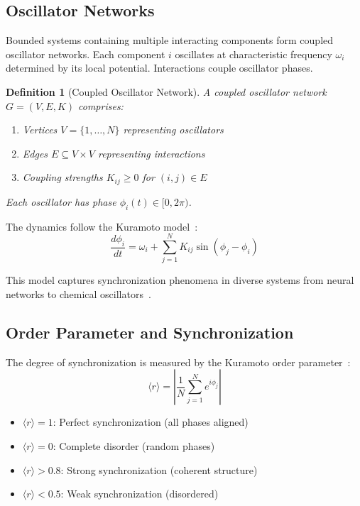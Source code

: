 \documentclass[twocolumn,aps,prb,superscriptaddress,longbibliography,floatfix]{revtex4-2}
\newtheorem{definition}[theorem]{Definition}
\theoremstyle{remark}
\newcommand{\orderpar}{\langle r \rangle}
\begin{document}
\subsection{Oscillator Networks}

Bounded systems containing multiple interacting components form coupled
oscillator networks. Each component $i$ oscillates at characteristic
frequency $\omega_i$ determined by its local potential. Interactions
couple oscillator phases.

\begin{definition}[Coupled Oscillator Network]
\label{def:oscillator}
A coupled oscillator network $G = (V, E, K)$ comprises:
\begin{enumerate}
    \item Vertices $V = \{1, \ldots, N\}$ representing oscillators
    \item Edges $E \subseteq V \times V$ representing interactions
    \item Coupling strengths $K_{ij} \geq 0$ for $(i,j) \in E$
\end{enumerate}
Each oscillator has phase $\phi_i(t) \in [0, 2\pi)$.
\end{definition}

The dynamics follow the Kuramoto model~\cite{Kuramoto1984}:
\begin{equation}
\frac{d\phi_i}{dt} = \omega_i + \sum_{j=1}^{N} K_{ij} \sin(\phi_j - \phi_i)
\label{eq:kuramoto}
\end{equation}

This model captures synchronization phenomena in diverse systems from
neural networks to chemical oscillators~\cite{Strogatz2000,Acebron2005}.

\subsection{Order Parameter and Synchronization}

The degree of synchronization is measured by the Kuramoto order
parameter~\cite{Kuramoto1984}:
\begin{equation}
\orderpar = \left| \frac{1}{N} \sum_{j=1}^{N} e^{i\phi_j} \right|
\label{eq:order}
\end{equation}

\begin{itemize}
    \item $\orderpar = 1$: Perfect synchronization (all phases aligned)
    \item $\orderpar = 0$: Complete disorder (random phases)
    \item $\orderpar > 0.8$: Strong synchronization (coherent structure)
    \item $\orderpar < 0.5$: Weak synchronization (disordered)
\end{itemize}
\end{document}
